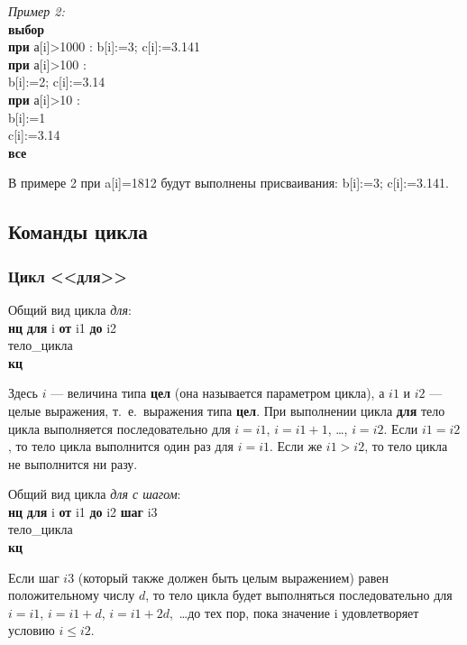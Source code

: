 \emph{Пример 2:}\\
{\sffamily
\textbf{выбор}\\
\otstup \textbf{при} а[i]>1000 : b[i]:=3; c[i]:=3.141\\
\otstup \textbf{при} а[i]>100 :\\
\otstup \otstup b[i]:=2; c[i]:=3.14\\
\otstup \textbf{при} а[i]>10 :\\
\otstup \otstup b[i]:=1\\
\otstup \otstup c[i]:=3.14\\
\textbf{все}
}

В примере 2 при \textsf{a[i]=1812} будут выполнены присваивания: \textsf{b[i]:=3; c[i]:=3.141}.

\subsection{Команды цикла}

\subsubsection[Цикл ''для'']{Цикл <<для>>}

Общий вид цикла \emph{для}:\\
{\sffamily
\textbf{нц} \textbf{для} i \textbf{от} i1 \textbf{до} i2\\
\otstup тело\_цикла\\
\textbf{кц}
}

Здесь $i$ --- величина типа \textbf{цел} (она называется параметром цикла), а $i1$ и $i2$ --- целые выражения, т.~е.~выражения типа \textbf{цел}. При выполнении цикла \textbf{для} тело цикла выполняется последовательно для $i=i1$, $i=i1+1$, \dots, $i=i2$. Если $i1=i2$, то тело цикла выполнится один раз для $i=i1$. Если же $i1>i2$, то тело цикла не выполнится ни разу.

Общий вид цикла \emph{для с шагом}:\\
{\sffamily
\textbf{нц} \textbf{для} i \textbf{от} i1 \textbf{до} i2 \textbf{шаг} i3\\
\otstup тело\_цикла\\
\textbf{кц}
}

Если шаг $i3$ (который также должен быть целым выражением) равен положительному числу $d$, то тело цикла будет выполняться последовательно для $i=i1$, $i=i1+d$, $i=i1+2d$,~\dots до тех пор, пока значение i удовлетворяет условию $i \le i2$.

